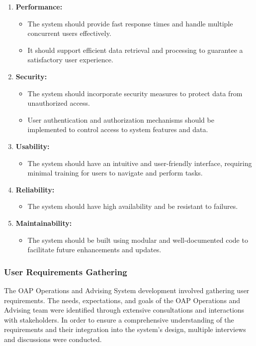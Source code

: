 \documentclass[12pt]{article}
\begin{document}
\begin{enumerate}[label=(\roman*)]
    \item \textbf{Performance:}
    \begin{itemize}
        \item The system should provide fast response times and handle multiple concurrent users effectively.
        \item It should support efficient data retrieval and processing to guarantee a satisfactory user experience.
    \end{itemize}
    \item \textbf{Security:}
    \begin{itemize}
        \item The system should incorporate security measures to protect data from unauthorized access.
        \item User authentication and authorization mechanisms should be implemented to control access to system features and data.
    \end{itemize}
    \item \textbf{Usability:}
    \begin{itemize}
        \item The system should have an intuitive and user-friendly interface, requiring minimal training for users to navigate and perform tasks.
    \end{itemize}
    \item \textbf{Reliability:}
    \begin{itemize}
        \item The system should have high availability and be resistant to failures.
    \end{itemize}
    \item \textbf{Maintainability:}
    \begin{itemize}
        \item The system should be built using modular and well-documented code to facilitate future enhancements and updates.
    \end{itemize}
\end{enumerate}

\subsubsection{User Requirements Gathering} 
The OAP Operations and Advising System development involved gathering user requirements. The needs, expectations, and goals of the OAP Operations and Advising team were identified through extensive consultations and interactions with stakeholders. In order to ensure a comprehensive understanding of the requirements and their integration into the system's design, multiple interviews and discussions were conducted.
\end{document}
